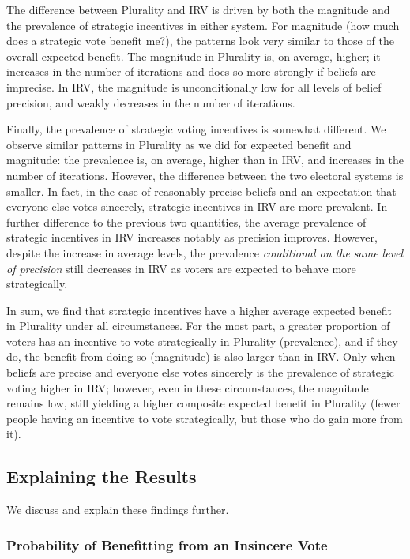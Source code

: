 \documentclass[11pt, letter]{article}
\begin{document}
The difference between Plurality and IRV is driven by both the magnitude and the prevalence of strategic incentives in either system. For magnitude (how much does a strategic vote benefit me?), the patterns look very similar to those of the overall expected benefit. The magnitude in Plurality is, on average, higher; it increases in the number of iterations and does so more strongly if beliefs are imprecise. In IRV, the magnitude is unconditionally low for all levels of belief precision, and weakly decreases in the number of iterations.

Finally, the prevalence of strategic voting incentives is somewhat different. We observe similar patterns in Plurality as we did for expected benefit and magnitude: the prevalence is, on average, higher than in IRV, and increases in the number of iterations. However, the difference between the two electoral systems is smaller. In fact, in the case of reasonably precise beliefs and an expectation that everyone else votes sincerely, strategic incentives in IRV are more prevalent. In further difference to the previous two quantities, the average prevalence of strategic incentives in IRV increases notably as precision improves. However, despite the increase in average levels, the prevalence \emph{conditional on the same level of precision} still decreases in IRV as voters are expected to behave more strategically.

In sum, we find that strategic incentives have a higher average expected benefit in Plurality under all circumstances. For the most part, a greater proportion of voters has an incentive to vote strategically in Plurality (prevalence), and if they do, the benefit from doing so (magnitude) is also larger than in IRV. Only when beliefs are precise and everyone else votes sincerely is the prevalence of strategic voting higher in IRV; however, even in these circumstances, the magnitude remains low, still yielding a higher composite expected benefit in Plurality (fewer people having an incentive to vote strategically, but those who do gain more from it).

\subsection{Explaining the Results}

We discuss and explain these findings further.

\subsubsection{Probability of Benefitting from an Insincere Vote}
\end{document}
